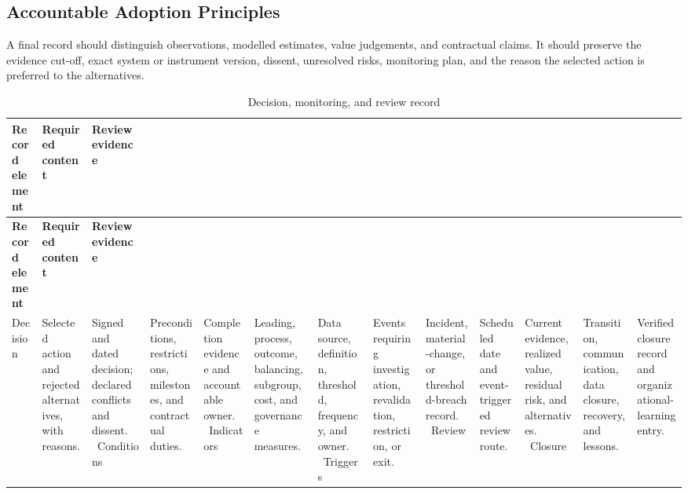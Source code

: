 \subsection{Accountable Adoption Principles}
\label{sec:comp-ch12-supp-3}
A final record should distinguish observations, modelled estimates, value
judgements, and contractual claims. It should preserve the evidence cut-off, exact
system or instrument version, dissent, unresolved risks, monitoring plan, and the
reason the selected action is preferred to the alternatives.

\begin{longtable}{@{}p{}p{}p{}@{}}
\caption{Decision, monitoring, and review record}
\label{tab:comp-ch12-decision-record}\\
\toprule
\textbf{Record element} & \textbf{Required content} & \textbf{Review evidence} \\
\midrule
\endfirsthead
\toprule
\textbf{Record element} & \textbf{Required content} & \textbf{Review evidence} \\
\midrule
\endhead
\bottomrule
\endlastfoot
Decision & Selected action and rejected alternatives, with reasons. & Signed and dated decision; declared conflicts and dissent. \
Conditions & Preconditions, restrictions, milestones, and contractual duties. & Completion evidence and accountable owner. \
Indicators & Leading, process, outcome, balancing, subgroup, cost, and governance measures. & Data source, definition, threshold, frequency, and owner. \
Triggers & Events requiring investigation, revalidation, restriction, or exit. & Incident, material-change, or threshold-breach record. \
Review & Scheduled date and event-triggered review route. & Current evidence, realized value, residual risk, and alternatives. \
Closure & Transition, communication, data closure, recovery, and lessons. & Verified closure record and organizational-learning entry. \
\end{longtable}
